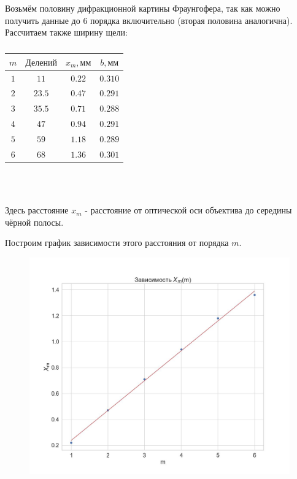 \documentclass[a4paper, 12pt]{article}
\begin{document}
Возьмём половину дифракционной картины Фраунгофера, так как можно получить данные до 6 порядка включительно (вторая половина аналогична). Рассчитаем также ширину щели:

\begin{table}[H]
\begin{center}
\begin{tabular}{|c|c|c|c|}\hline
$m$ & $\text{Делений}$ & $x_m, \text{мм}$ & $b, \text{мм}$\\\hline
$1$ & $11$  & $0.22$  & $ 0.310$ \\\hline
$2$ & $23.5$ & $0.47$  & $0.291$ \\\hline
$3$ & $35.5$ & $0.71$  & $0.288$ \\\hline
$4$ & $47$ & $0.94$  & $0.291$ \\\hline
$5$ & $59$ & $1.18$  & $0.289$ \\\hline
$6$ & $68$ & $1.36$  & $0.301$ \\\hline
\end{tabular}\\~\\
\end{center}
\caption{\label{tab:second}}
\end{table}

Здесь расстояние $x_m$ - расстояние от оптической оси объектива до середины чёрной полосы.

Построим график зависимости этого расстояния от порядка $m$.

\begin{figure}[H]
    \centering
    \includegraphics[width=1\textwidth]{Fraunhofer.jpg}
\end{figure}
\end{document}
